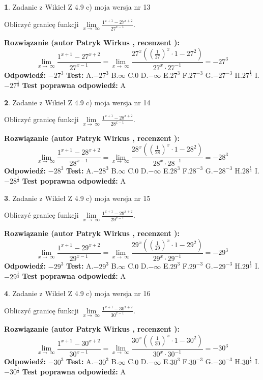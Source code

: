 \documentclass[12pt, a4paper]{article}
\theoremstyle{definition} %
\newtheorem{zad}{}
\newcommand{\zadStart}[1]{\begin{zad}#1\newline}
\newcommand{\zadStop}{\end{zad}}
\newcommand{\rozwStart}[2]{\noindent \textbf{Rozwiązanie (autor #1 , recenzent #2): }\newline}
\newcommand{\rozwStop}{\newline}
\newcommand{\odpStart}{\noindent \textbf{Odpowiedź:}\newline}
\newcommand{\odpStop}{\newline}
\newcommand{\testStart}{\noindent \textbf{Test:}\newline}
\newcommand{\testStop}{\newline}
\newcommand{\kluczStart}{\noindent \textbf{Test poprawna odpowiedź:}\newline}
\newcommand{\kluczStop}{\newline}
\begin{document}
\zadStart{Zadanie z Wikieł Z 4.9 c) moja wersja nr 13}


Obliczyć granicę funkcji  $\lim\limits_{x\to\ \infty}\frac{1^{x+1}-27^{x+2}}{27^{x-1}}$.
\zadStop
\rozwStart{Patryk Wirkus}{}
$$\lim\limits_{x\to\ \infty}\frac{1^{x+1}-27^{x+2}}{27^{x-1}}=\lim\limits_{x\to\ \infty}\frac{27^{x}((\frac{1}{27})^{x}\cdot 1 -27^{2})}{27^{x}\cdot 27^{-1}} = -27^{3}$$
\rozwStop
\odpStart
$-27^{3}$
\odpStop
\testStart
A.$-27^{3}$ B.$\infty$ C.$0$ D.$-\infty$ E.$27^{3}$
F.$27^{-3}$ G.$-27^{-3}$
H.$27^{\frac{1}{3}}$
I.$-27^{\frac{1}{3}}$
\testStop
\kluczStart
A
\kluczStop



\zadStart{Zadanie z Wikieł Z 4.9 c) moja wersja nr 14}


Obliczyć granicę funkcji  $\lim\limits_{x\to\ \infty}\frac{1^{x+1}-28^{x+2}}{28^{x-1}}$.
\zadStop
\rozwStart{Patryk Wirkus}{}
$$\lim\limits_{x\to\ \infty}\frac{1^{x+1}-28^{x+2}}{28^{x-1}}=\lim\limits_{x\to\ \infty}\frac{28^{x}((\frac{1}{28})^{x}\cdot 1 -28^{2})}{28^{x}\cdot 28^{-1}} = -28^{3}$$
\rozwStop
\odpStart
$-28^{3}$
\odpStop
\testStart
A.$-28^{3}$ B.$\infty$ C.$0$ D.$-\infty$ E.$28^{3}$
F.$28^{-3}$ G.$-28^{-3}$
H.$28^{\frac{1}{3}}$
I.$-28^{\frac{1}{3}}$
\testStop
\kluczStart
A
\kluczStop



\zadStart{Zadanie z Wikieł Z 4.9 c) moja wersja nr 15}


Obliczyć granicę funkcji  $\lim\limits_{x\to\ \infty}\frac{1^{x+1}-29^{x+2}}{29^{x-1}}$.
\zadStop
\rozwStart{Patryk Wirkus}{}
$$\lim\limits_{x\to\ \infty}\frac{1^{x+1}-29^{x+2}}{29^{x-1}}=\lim\limits_{x\to\ \infty}\frac{29^{x}((\frac{1}{29})^{x}\cdot 1 -29^{2})}{29^{x}\cdot 29^{-1}} = -29^{3}$$
\rozwStop
\odpStart
$-29^{3}$
\odpStop
\testStart
A.$-29^{3}$ B.$\infty$ C.$0$ D.$-\infty$ E.$29^{3}$
F.$29^{-3}$ G.$-29^{-3}$
H.$29^{\frac{1}{3}}$
I.$-29^{\frac{1}{3}}$
\testStop
\kluczStart
A
\kluczStop



\zadStart{Zadanie z Wikieł Z 4.9 c) moja wersja nr 16}


Obliczyć granicę funkcji  $\lim\limits_{x\to\ \infty}\frac{1^{x+1}-30^{x+2}}{30^{x-1}}$.
\zadStop
\rozwStart{Patryk Wirkus}{}
$$\lim\limits_{x\to\ \infty}\frac{1^{x+1}-30^{x+2}}{30^{x-1}}=\lim\limits_{x\to\ \infty}\frac{30^{x}((\frac{1}{30})^{x}\cdot 1 -30^{2})}{30^{x}\cdot 30^{-1}} = -30^{3}$$
\rozwStop
\odpStart
$-30^{3}$
\odpStop
\testStart
A.$-30^{3}$ B.$\infty$ C.$0$ D.$-\infty$ E.$30^{3}$
F.$30^{-3}$ G.$-30^{-3}$
H.$30^{\frac{1}{3}}$
I.$-30^{\frac{1}{3}}$
\testStop
\kluczStart
A
\kluczStop
\end{document}
